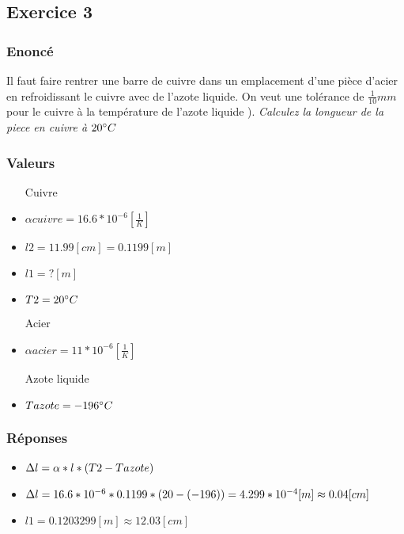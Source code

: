 
\subsection{Exercice 3}
\subsubsection{Enoncé}
Il faut faire rentrer une barre de cuivre dans un emplacement d'une pièce d'acier en refroidissant le cuivre avec de l'azote liquide. On veut une tolérance de $\frac{1}{10}mm$ pour le cuivre à la température de l'azote liquide ).
\textit{Calculez la longueur de la piece en cuivre à $20\celsius$}

\subsubsection{Valeurs}
\begin{itemize}
    \item[Cuivre]
    \item ${\alpha}cuivre = 16.6 * 10^{-6}[\frac{1}{K}]$
    \item $l2 = 11.99[cm] = 0.1199 [m]$
    \item $l1 = ? [m]$
    \item $T2 = 20\celsius$
    \item[Acier]
    \item ${\alpha}acier = 11 * 10^{-6}[\frac{1}{K}]$
    \item[Azote liquide]
    \item  $Tazote = -196\celsius$
\end{itemize}

\subsubsection{Réponses}
\begin{itemize} 
    \item $\dl = \alpha * l * (T2 - Tazote)$
    \item $\dl = 16.6 * 10^{-6} * 0.1199 * (20 - (-196)) = 4.299 * 10^{-4} [m] \approx 0.04[cm]$
    \item $l1 = 0.1203299[m] \approx 12.03 [cm]$
\end{itemize}
